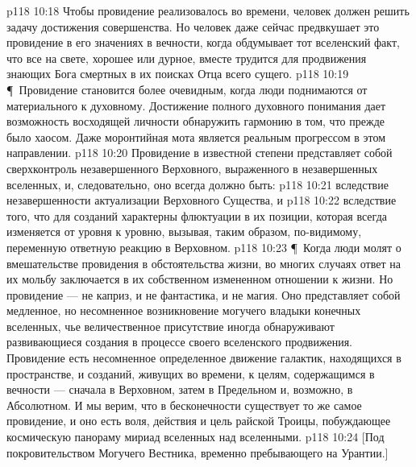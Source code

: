 \vs p118 10:18 Чтобы провидение реализовалось во времени, человек должен решить задачу достижения совершенства. Но человек даже сейчас предвкушает это провидение в его значениях в вечности, когда обдумывает тот вселенский факт, что все на свете, хорошее или дурное, вместе трудится для продвижения знающих Бога смертных в их поисках Отца всего сущего.
\vs p118 10:19 \P\ Провидение становится более очевидным, когда люди поднимаются от материального к духовному. Достижение полного духовного понимания дает возможность восходящей личности обнаружить гармонию в том, что прежде было хаосом. Даже моронтийная мота является реальным прогрессом в этом направлении.
\vs p118 10:20 Провидение в известной степени представляет собой сверхконтроль незавершенного Верховного, выраженного в незавершенных вселенных, и, следовательно, оно всегда должно быть:
\vs p118 10:21 \bibnobreakspace {} вследствие незавершенности актуализации Верховного Существа, и
\vs p118 10:22 \bibnobreakspace {} вследствие того, что для созданий характерны флюктуации в их позиции, которая всегда изменяется от уровня к уровню, вызывая, таким образом, по\hyp{}видимому, переменную ответную реакцию в Верховном.
\vs p118 10:23 \P\ Когда люди молят о вмешательстве провидения в обстоятельства жизни, во многих случаях ответ на их мольбу заключается в их собственном измененном отношении к жизни. Но провидение --- не каприз, и не фантастика, и не магия. Оно представляет собой медленное, но несомненное возникновение могучего владыки конечных вселенных, чье величественное присутствие иногда обнаруживают развивающиеся создания в процессе своего вселенского продвижения. Провидение есть несомненное определенное движение галактик, находящихся в пространстве, и созданий, живущих во времени, к целям, содержащимся в вечности --- сначала в Верховном, затем в Предельном и, возможно, в Абсолютном. И мы верим, что в бесконечности существует то же самое провидение, и оно есть воля, действия и цель райской Троицы, побуждающее космическую панораму мириад вселенных над вселенными.
\vs p118 10:24 [Под покровительством Могучего Вестника, временно пребывающего на Урантии.]
